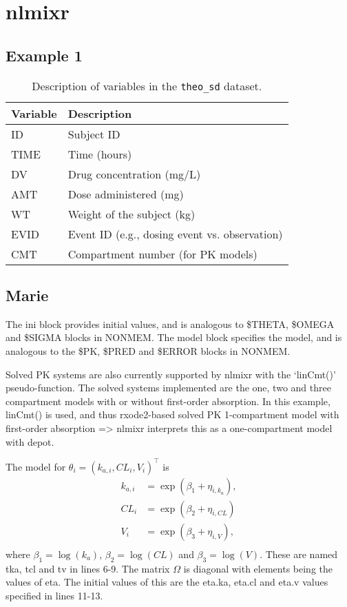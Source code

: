 \chapter{nlmixr}

\section{Example 1}

\begin{table}[h]
    \centering
    \begin{tabular}{|l|l|}
        \hline
        \textbf{Variable} & \textbf{Description} \\ 
        \hline
        ID      & Subject ID \\ 
        TIME    & Time (hours) \\ 
        DV      & Drug concentration (mg/L) \\ 
        AMT     & Dose administered (mg) \\ 
        WT      & Weight of the subject (kg) \\ 
        EVID    & Event ID (e.g., dosing event vs. observation) \\ 
        CMT     & Compartment number (for PK models) \\ 
        \hline
    \end{tabular}
    \caption{Description of variables in the \texttt{theo\_sd} dataset.}
    \label{tab:theo_sd}
\end{table}

\section{Marie}
The ini block provides initial values, and is analogous to \$THETA, \$OMEGA and \$SIGMA blocks in NONMEM. The  model block specifies the model, and is analogous to the \$PK, \$PRED and \$ERROR blocks in NONMEM.

Solved PK systems are also currently supported by nlmixr with the ‘linCmt()’ pseudo-function. The solved systems implemented are the one, two and three compartment models with or without first-order absorption. In this example, linCmt() is used, and thus rxode2-based solved PK 1-compartment model with first-order absorption => nlmixr interprets this as a one-compartment model with depot.

The model for $\theta_i = (k_{a,i}, CL_{i}, V_i)^\top$ is
\begin{align*}
    k_{a,i}&=\exp(\beta_1+\eta_{i,k_a}),\\
    CL_i &= \exp(\beta_2+\eta_{i,CL})\\
    V_{i}&=\exp(\beta_3+\eta_{i,V}),\\
\end{align*}
where $\beta_1 = \log(k_a)$, $\beta_2 = \log(CL)$ and $\beta_3=\log(V)$. These are named tka, tcl and tv in lines 6-9. The matrix $\Omega$ is diagonal with elements being the values of eta. The initial values of this are the eta.ka, eta.cl and eta.v values specified in lines 11-13. 

